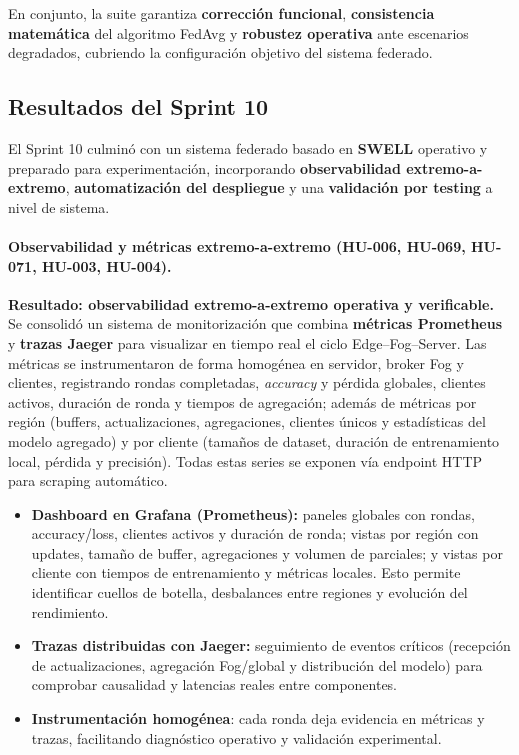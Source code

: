 \documentclass{report}
\begin{document}
En conjunto, la suite garantiza \textbf{corrección funcional}, \textbf{consistencia matemática} del algoritmo FedAvg y \textbf{robustez operativa} ante escenarios degradados, cubriendo la configuración objetivo del sistema federado.



\subsection{Resultados del Sprint 10}


El Sprint 10 culminó con un sistema federado basado en \textbf{SWELL} operativo y preparado para experimentación, incorporando \textbf{observabilidad extremo-a-extremo}, \textbf{automatización del despliegue} y una \textbf{validación por testing} a nivel de sistema.

\paragraph{Observabilidad y métricas extremo-a-extremo (HU-006, HU-069, HU-071, HU-003, HU-004).}
\textbf{Resultado: observabilidad extremo-a-extremo operativa y verificable.} Se consolidó un sistema de monitorización que combina \textbf{métricas Prometheus} y \textbf{trazas Jaeger} para visualizar en tiempo real el ciclo Edge--Fog--Server. Las métricas se instrumentaron de forma homogénea en servidor, broker Fog y clientes, registrando rondas completadas, \emph{accuracy} y pérdida globales, clientes activos, duración de ronda y tiempos de agregación; además de métricas por región (buffers, actualizaciones, agregaciones, clientes únicos y estadísticas del modelo agregado) y por cliente (tamaños de dataset, duración de entrenamiento local, pérdida y precisión). Todas estas series se exponen vía endpoint HTTP para scraping automático.

\begin{itemize}\setlength\itemsep{0.15em}
    \item \textbf{Dashboard en Grafana (Prometheus):} paneles globales con rondas, accuracy/loss, clientes activos y duración de ronda; vistas por región con updates, tamaño de buffer, agregaciones y volumen de parciales; y vistas por cliente con tiempos de entrenamiento y métricas locales. Esto permite identificar cuellos de botella, desbalances entre regiones y evolución del rendimiento.
    \item \textbf{Trazas distribuidas con Jaeger:} seguimiento de eventos críticos (recepción de actualizaciones, agregación Fog/global y distribución del modelo) para comprobar causalidad y latencias reales entre componentes.
    \item \textbf{Instrumentación homogénea}: cada ronda deja evidencia en métricas y trazas, facilitando diagnóstico operativo y validación experimental.
\end{itemize}
\end{document}
